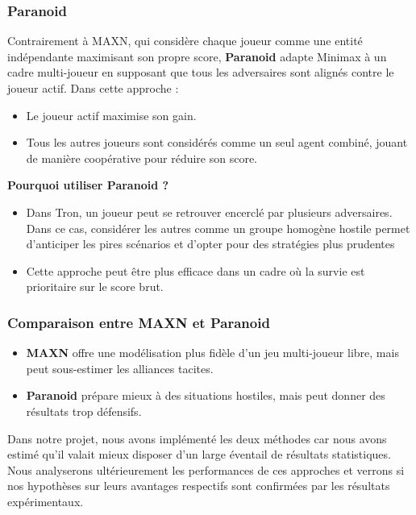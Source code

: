 \newpage

\subsubsection{Paranoid}
Contrairement à MAXN, qui considère chaque joueur comme une entité indépendante maximisant son propre score, \textbf{Paranoid} adapte Minimax à un cadre multi-joueur en supposant que tous les adversaires sont alignés contre le joueur actif.
Dans cette approche :
\begin{itemize}
    \item Le joueur actif maximise son gain.
    \item Tous les autres joueurs sont considérés comme un seul agent combiné, jouant de manière coopérative pour réduire son score.
\end{itemize}
\textbf{Pourquoi utiliser Paranoid ?}
\begin{itemize}
    \item Dans Tron, un joueur peut se retrouver encerclé par plusieurs adversaires. Dans ce cas, considérer les autres comme un groupe homogène hostile permet d'anticiper les pires scénarios et d'opter pour des stratégies plus prudentes
    \item Cette approche peut être plus efficace dans un cadre où la survie est prioritaire sur le score brut.
\end{itemize}

\subsubsection{Comparaison entre MAXN et Paranoid}
\begin{itemize}
    \item \textbf{MAXN} offre une modélisation plus fidèle d'un jeu multi-joueur libre, mais peut sous-estimer les alliances tacites.
    \item \textbf{Paranoid} prépare mieux à des situations hostiles, mais peut donner des résultats trop défensifs.
\end{itemize}
Dans notre projet, nous avons implémenté les deux méthodes car nous avons estimé qu'il valait mieux disposer d'un large éventail de résultats statistiques. Nous analyserons ultérieurement les performances de ces approches et verrons si nos hypothèses sur leurs avantages respectifs sont confirmées par les résultats expérimentaux.

